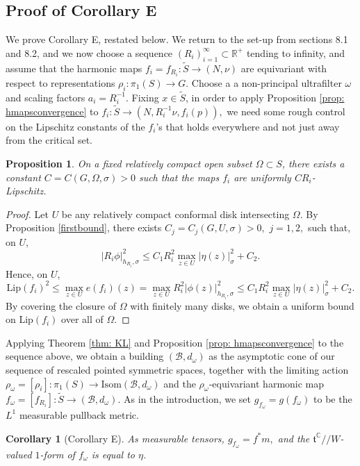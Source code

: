 \documentclass[10pt]{amsart}
\newcommand{\R}{\mathbb R}
\newtheorem{prop}[thm]{Proposition}
\newtheorem{cor}[thm]{Corollary}
\theoremstyle{definition}
\DeclareMathOperator{\C}{\mathbb{C}}
\begin{document}
\subsection{Proof of Corollary E}
We prove Corollary E, restated below. We return to the set-up from sections 8.1 and 8.2, and we now choose a sequence $(R_i)_{i=1}^\infty\subset \R^+$ tending to infinity, and assume that the harmonic maps $f_i=f_{R_i}:\tilde{S}\to (N,\nu)$ are equivariant with respect to representations $\rho_i:\pi_1(S)\to G$. Choose a a non-principal ultrafilter $\omega$ and scaling factors $a_i=R_i^{-1}.$ Fixing $x\in \tilde{S}$, in order to apply Proposition \ref{prop: hmapsconvergence} to $f_i:\tilde{S}\to (N,R_i^{-1}\nu, f_i(p)),$ we need some rough control on the Lipschitz constants of the $f_i$'s that holds everywhere and not just away from the critical set.
\begin{prop}\label{roughlipbound}
    On a fixed relatively compact open subset $\Omega\subset S$, there exists a constant $C=C(G,\Omega,\sigma)>0$ such that the maps $f_i$ are uniformly $CR_i$-Lipschitz. 
\end{prop}
\begin{proof}
Let $U$ be any relatively compact conformal disk intersecting $\Omega$. By Proposition \ref{firstbound}, there exists $C_j=C_j(G,U,\sigma)>0,$ $j=1,2,$ such that, on $U$,
 $$|R_i\phi|_{h_{R_i},\sigma}^2\leq C_1R_i^2\max_{z\in U}|\eta(z)|_{\sigma}^2 +C_2.$$ Hence, on $U$, $$\textrm{Lip}(f_i)^2\leq \max_{z\in U} e(f_i)(z)=\max_{z\in U} R_i^2|\phi(z)|_{h_{R_i},\sigma}^2\leq C_1R_i^2\max_{z\in U}|\eta(z)|_{\sigma}^2 +C_2.$$ By covering the closure of $\Omega$ with finitely many disks, we obtain a uniform bound on $\textrm{Lip}(f_i)$ over all of $\Omega$.
\end{proof}
 Applying Theorem \ref{thm: KL} and Proposition \ref{prop: hmapsconvergence} to the sequence above, we obtain a building $(\mathcal{B},d_\omega)$ as the asymptotic cone of our sequence of rescaled pointed symmetric spaces, together with the limiting action $\rho_\omega=[\rho_i]:\pi_1(S)\to \textrm{Isom}(\mathcal{B},d_\omega)$ and the $\rho_\omega$-equivariant harmonic map $f_\omega=[f_{R_i}]: \tilde{S}\to (\mathcal{B},d_\omega).$ As in the introduction, we set $g_{f_\omega}=g(f_\omega)$ to be the $L^1$ measurable pullback metric.
 \begin{cor}[Corollary E]
     As measurable tensors, $g_{f_\omega}=f^*m,$ and the $\mathfrak{t}^{\C}//W$-valued $1$-form of $f_\omega$ is equal to $\eta$.
 \end{cor}
\end{document}
